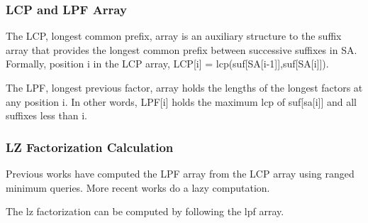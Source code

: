 \subsubsection{LCP and LPF Array}

The LCP, longest common prefix, array is an auxiliary structure to the suffix array that provides the longest common prefix between successive suffixes in SA. Formally, position i in the LCP array, LCP[i] = lcp(suf[SA[i-1]],suf[SA[i]]).

The LPF, longest previous factor, array holds the lengths of the longest factors at any position i. In other words, LPF[i] holds the maximum lcp of suf[sa[i]] and all suffixes less than i.

\subsubsection{LZ Factorization Calculation}

Previous works have computed the LPF array from the LCP array using ranged minimum queries. More recent works do a lazy computation.

The lz factorization can be computed by following the lpf array.

